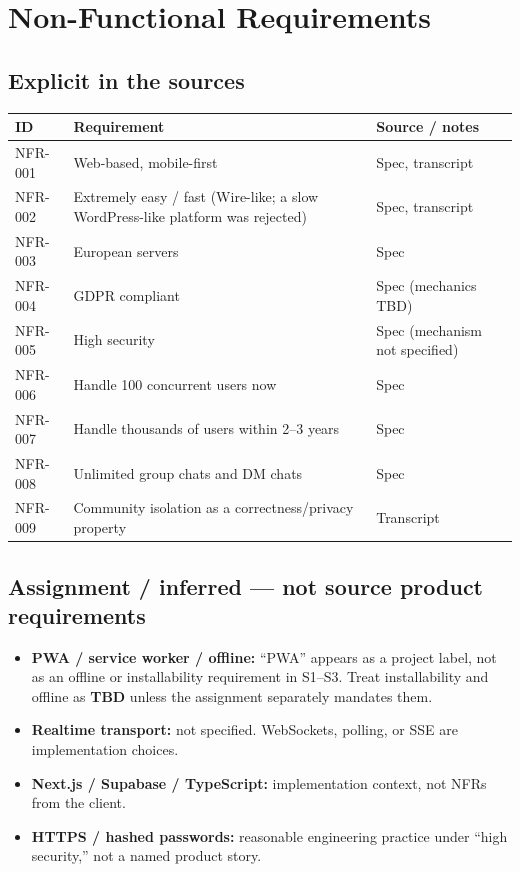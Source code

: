 \documentclass[11pt,a4paper]{article}
\begin{document}
\section{Non-Functional Requirements}

\subsection{Explicit in the sources}
\begin{tabularx}{\textwidth}{@{}l l Y@{}}
\toprule
\textbf{ID} & \textbf{Requirement} & \textbf{Source / notes} \\
\midrule
NFR-001 & Web-based, mobile-first & Spec, transcript \\
NFR-002 & Extremely easy / fast (Wire-like; a slow WordPress-like platform was rejected) & Spec, transcript \\
NFR-003 & European servers & Spec \\
NFR-004 & GDPR compliant & Spec (mechanics TBD) \\
NFR-005 & High security & Spec (mechanism not specified) \\
NFR-006 & Handle 100 concurrent users now & Spec \\
NFR-007 & Handle thousands of users within 2--3 years & Spec \\
NFR-008 & Unlimited group chats and DM chats & Spec \\
NFR-009 & Community isolation as a correctness/privacy property & Transcript \\
\bottomrule
\end{tabularx}

\subsection{Assignment / inferred --- not source product requirements}
\begin{itemize}
  \item \textbf{PWA / service worker / offline:} ``PWA'' appears as a project label, not as an offline or installability requirement in S1--S3. Treat installability and offline as \textbf{TBD} unless the assignment separately mandates them.
  \item \textbf{Realtime transport:} not specified. WebSockets, polling, or SSE are implementation choices.
  \item \textbf{Next.js / Supabase / TypeScript:} implementation context, not NFRs from the client.
  \item \textbf{HTTPS / hashed passwords:} reasonable engineering practice under ``high security,'' not a named product story.
\end{itemize}
\end{document}
